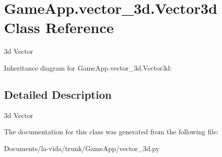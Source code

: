 \hypertarget{classGameApp_1_1vector__3d_1_1Vector3d}{
\section{GameApp.vector\_\-3d.Vector3d Class Reference}
\label{classGameApp_1_1vector__3d_1_1Vector3d}
}
3d Vector  


Inheritance diagram for GameApp.vector\_\-3d.Vector3d:

\subsection{Detailed Description}
3d Vector 

The documentation for this class was generated from the following file:\begin{CompactItemize}
\item 
Documents/la-vida/trunk/GameApp/vector\_\-3d.py\end{CompactItemize}
